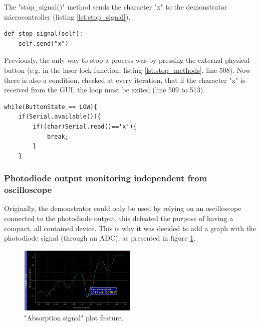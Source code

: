 \documentclass[a4paper,12pt]{article}
\begin{document}
The "stop\_signal()" method sends the character "x" to the demonstrator microcontroller (listing \ref{lst:stop_signal}).

\begin{lstlisting}[style=python,label={lst:stop_signal},caption={Stop signal method (file: mac\_device.py).},firstnumber=247]
def stop_signal(self):
    self.send("x")
\end{lstlisting}

Previously, the only way to stop a process was by pressing the external physical button (e.g. in the laser lock function, listing \ref{lst:stop_methods}, line 508). Now there is also a condition, checked at every iteration, that if the character "x" is received from the GUI, the loop must be exited (line 509 to 513).

\begin{lstlisting}[style=c++,label={lst:stop_methods},caption={Stop signal methods in laser lock function (file: mac.ino).},firstnumber=508]
while(ButtonState == LOW){
    if(Serial.available()){
        if((char)Serial.read()=='x'){
            break;
        }
    }
\end{lstlisting}

\subsubsection{Photodiode output monitoring independent from oscilloscope}
\label{section:output_monitoring}

Originally, the demonstrator could only be used by relying on an oscilloscope connected to the photodiode output, this defeated the purpose of having a compact, all contained device. This is why it was decided to add a graph with the photodiode signal (through an ADC), as presented in figure \ref{fig:absorption_graph}.

\begin{figure}[!h]
    \centering
    \includegraphics[width=0.5\textwidth]{Images/absorption_signal.png}
    \captionsetup{justification=centering}
    \caption{"Absorption signal" plot feature.} 
    \label{fig:absorption_graph}
\end{figure}
\end{document}
